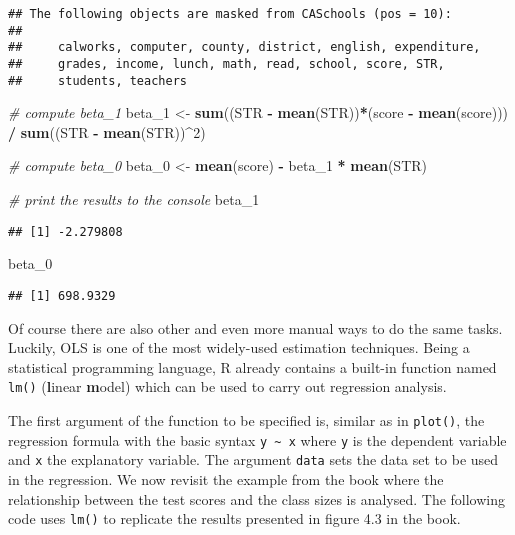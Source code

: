 \documentclass[]{book}
\newenvironment{Shaded}{\begin{snugshade}}{\end{snugshade}}
\newcommand{\KeywordTok}[1]{\textcolor[rgb]{0.13,0.29,0.53}{\textbf{#1}}}
\newcommand{\DecValTok}[1]{\textcolor[rgb]{0.00,0.00,0.81}{#1}}
\newcommand{\StringTok}[1]{\textcolor[rgb]{0.31,0.60,0.02}{#1}}
\newcommand{\CommentTok}[1]{\textcolor[rgb]{0.56,0.35,0.01}{\textit{#1}}}
\newcommand{\OperatorTok}[1]{\textcolor[rgb]{0.81,0.36,0.00}{\textbf{#1}}}
\newcommand{\NormalTok}[1]{#1}
\theoremstyle{definition}
\theoremstyle{definition}
\theoremstyle{definition}
\theoremstyle{remark}
\begin{document}
\begin{verbatim}
## The following objects are masked from CASchools (pos = 10):
## 
##     calworks, computer, county, district, english, expenditure,
##     grades, income, lunch, math, read, school, score, STR,
##     students, teachers
\end{verbatim}

\begin{Shaded}
\begin{Highlighting}[]
\CommentTok{# compute beta_1 }
\NormalTok{beta_}\DecValTok{1}\NormalTok{ <-}\StringTok{ }\KeywordTok{sum}\NormalTok{((STR }\OperatorTok{-}\StringTok{ }\KeywordTok{mean}\NormalTok{(STR))}\OperatorTok{*}\NormalTok{(score }\OperatorTok{-}\StringTok{ }\KeywordTok{mean}\NormalTok{(score))) }\OperatorTok{/}\StringTok{ }\KeywordTok{sum}\NormalTok{((STR }\OperatorTok{-}\StringTok{ }\KeywordTok{mean}\NormalTok{(STR))}\OperatorTok{^}\DecValTok{2}\NormalTok{)}

\CommentTok{# compute beta_0}
\NormalTok{beta_}\DecValTok{0}\NormalTok{ <-}\StringTok{ }\KeywordTok{mean}\NormalTok{(score) }\OperatorTok{-}\StringTok{ }\NormalTok{beta_}\DecValTok{1} \OperatorTok{*}\StringTok{ }\KeywordTok{mean}\NormalTok{(STR)}

\CommentTok{# print the results to the console}
\NormalTok{beta_}\DecValTok{1}
\end{Highlighting}
\end{Shaded}

\begin{verbatim}
## [1] -2.279808
\end{verbatim}

\begin{Shaded}
\begin{Highlighting}[]
\NormalTok{beta_}\DecValTok{0}
\end{Highlighting}
\end{Shaded}

\begin{verbatim}
## [1] 698.9329
\end{verbatim}

Of course there are also other and even more manual ways to do the same
tasks. Luckily, OLS is one of the most widely-used estimation
techniques. Being a statistical programming language, R already contains
a built-in function named \texttt{lm()} (\textbf{l}inear \textbf{m}odel)
which can be used to carry out regression analysis.

The first argument of the function to be specified is, similar as in
\texttt{plot()}, the regression formula with the basic syntax
\texttt{y\ \textasciitilde{}\ x} where \texttt{y} is the dependent
variable and \texttt{x} the explanatory variable. The argument
\texttt{data} sets the data set to be used in the regression. We now
revisit the example from the book where the relationship between the
test scores and the class sizes is analysed. The following code uses
\texttt{lm()} to replicate the results presented in figure 4.3 in the
book.
\end{document}
